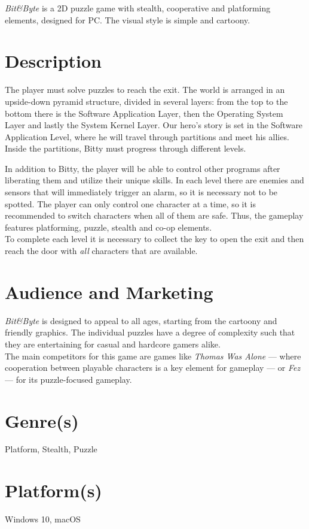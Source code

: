 \documentclass[12pt, a4paper]{report}
\begin{document}
\textit{Bit&Byte} is a 2D puzzle game with stealth, cooperative and platforming elements, designed for PC. The visual style is simple and cartoony.\\

\section*{Description}
The player must solve puzzles to reach the exit. The world is arranged in an upside-down pyramid structure, divided in several layers: from the top to the bottom there is the Software Application Layer, then the Operating System Layer and lastly the System Kernel Layer. Our hero’s story is set in the Software Application Level, where he will travel through partitions and meet his allies. Inside the partitions, Bitty must progress through different levels.

In addition to Bitty, the player will be able to control other programs after liberating them and utilize their unique skills. In each level there are enemies and sensors that will immediately trigger an alarm, so it is necessary not to be spotted. The player can only control one character at a time, so it is recommended to switch characters when all of them are safe.
Thus, the gameplay features platforming, puzzle, stealth and co-op elements.\\

To complete each level it is necessary to collect the key to open the exit and then reach the door with \textit{all} characters that are available.

\section*{Audience and Marketing}
\textit{Bit&Byte} is designed to appeal to all ages, starting from the cartoony and friendly graphics. The individual puzzles have a degree of complexity such that they are entertaining for casual and hardcore gamers alike.\\
The main competitors for this game are games like \textit{Thomas Was Alone} --- where cooperation between playable characters is a key element for gameplay --- or \textit{Fez} --- for its puzzle-focused gameplay.

\section*{Genre(s)}
Platform, Stealth, Puzzle
\section*{Platform(s)}
Windows 10, macOS
\end{document}
